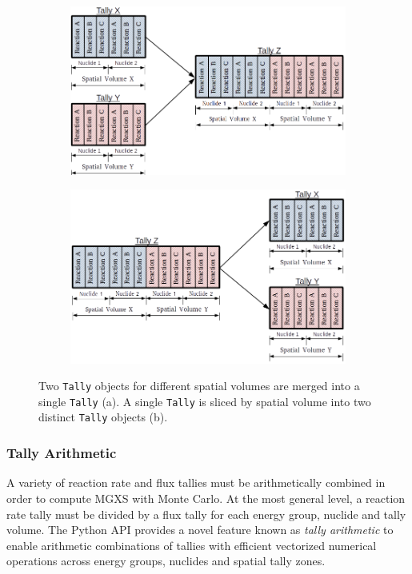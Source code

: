 \begin{figure}
\begin{subfigure}{\textwidth}
  \centering
  \includegraphics[width=0.6\linewidth]{figures/tally-merge}
  \caption{}
\end{subfigure}
\begin{subfigure}{\textwidth}
  \centering
  \includegraphics[width=0.6\linewidth]{figures/tally-slice}
  \caption{}
\end{subfigure}
\caption{Two \texttt{Tally} objects for different spatial volumes are merged into a single \texttt{Tally} (a). A single \texttt{Tally} is sliced by spatial volume into two distinct \texttt{Tally} objects (b).}
\label{fig:tally-merge-slice}
\end{figure}

\subsubsection{Tally Arithmetic}
\label{subsubsec:tally-arithmetic}

A variety of reaction rate and flux tallies must be arithmetically combined in order to compute MGXS with Monte Carlo. At the most general level, a reaction rate tally must be divided by a flux tally for each energy group, nuclide and tally volume. The Python API provides a novel feature known as \textit{tally arithmetic} to enable arithmetic combinations of tallies with efficient vectorized numerical operations across energy groups, nuclides and spatial tally zones.

